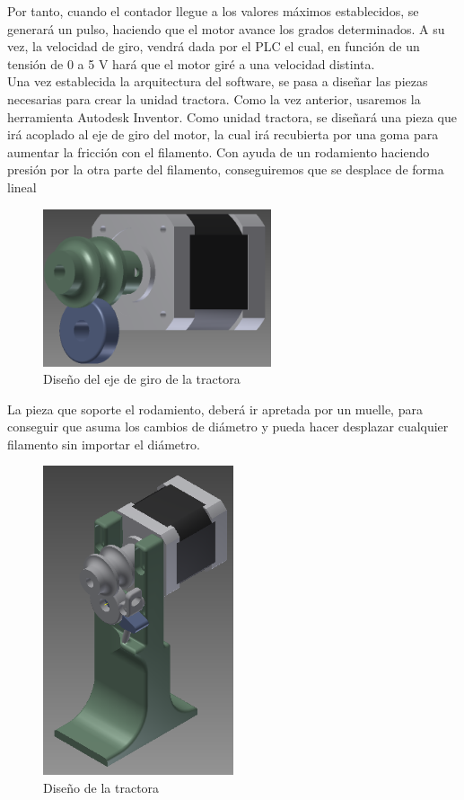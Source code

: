 Por tanto, cuando el contador llegue a los valores máximos establecidos, se generará un pulso, haciendo que el motor avance los grados determinados. A su vez, la velocidad de giro, vendrá dada por el PLC el cual, en función de un tensión de 0 a 5 V hará que el motor giré a una velocidad distinta.\\

Una vez establecida la arquitectura del software, se pasa a diseñar las piezas necesarias para crear la unidad tractora. Como la vez anterior, usaremos la herramienta Autodesk Inventor. Como unidad tractora, se diseñará una pieza que irá acoplado al eje de giro del motor, la cual irá recubierta por una goma para aumentar la fricción con el filamento. Con ayuda de un rodamiento haciendo presión por la otra parte del filamento, conseguiremos que se desplace de forma lineal

\begin{figure}[H]
    \centering
    \includegraphics[width=0.6\textwidth]{images/producciones/tractora/motor.png}
    \caption{Diseño del eje de giro de la tractora}
    \label{fig:tractora}
\end{figure}


La pieza que soporte el rodamiento, deberá ir apretada por un muelle, para conseguir que asuma los cambios de diámetro y pueda hacer desplazar cualquier filamento sin importar el diámetro.

\begin{figure}[H]
    \centering
    \includegraphics[width=0.5\textwidth]{images/producciones/tractora/asembli.png}
    \caption{Diseño de la tractora}
    \label{fig:tractora2}
\end{figure}

